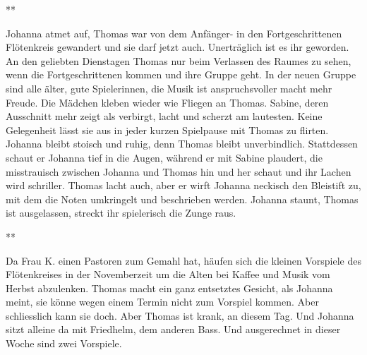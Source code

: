 \documentclass[10pt,titlepage,a5paper]{book}
\newcommand{\sterne}{\par{\centering ***\par}}
\begin{document}
\sterne


Johanna atmet auf, Thomas war von dem Anfänger- in den Fortgeschrittenen Flötenkreis gewandert und sie darf jetzt auch. Unerträglich ist es ihr geworden. An den geliebten Dienstagen Thomas nur beim Verlassen des Raumes zu sehen, wenn die Fortgeschrittenen kommen und ihre Gruppe geht.
In der neuen Gruppe sind alle älter, gute Spielerinnen, die Musik ist anspruchsvoller macht mehr Freude. Die Mädchen kleben wieder wie Fliegen an Thomas. Sabine, deren Ausschnitt mehr zeigt als verbirgt, lacht und scherzt am lautesten. Keine Gelegenheit lässt sie aus in jeder kurzen Spielpause mit Thomas zu flirten. Johanna bleibt stoisch und ruhig, denn Thomas bleibt unverbindlich. Stattdessen schaut er Johanna tief in die Augen, während er mit Sabine plaudert, die misstrauisch zwischen Johanna und Thomas hin und her schaut und ihr Lachen wird schriller. Thomas lacht auch, aber er wirft Johanna neckisch den Bleistift zu, mit dem die Noten umkringelt und beschrieben werden. Johanna staunt, Thomas ist ausgelassen, streckt ihr spielerisch die Zunge raus.



\sterne


Da Frau K. einen Pastoren zum Gemahl  hat, häufen sich die kleinen Vorspiele des Flötenkreises  in der Novemberzeit um die Alten bei Kaffee und Musik vom Herbst abzulenken. Thomas macht ein ganz entsetztes Gesicht, als Johanna meint, sie könne wegen einem Termin nicht zum Vorspiel kommen. Aber schliesslich kann sie doch. Aber Thomas ist krank, an diesem Tag. Und Johanna sitzt alleine da mit Friedhelm, dem anderen Bass. Und ausgerechnet in dieser Woche sind zwei Vorspiele.
\end{document}
